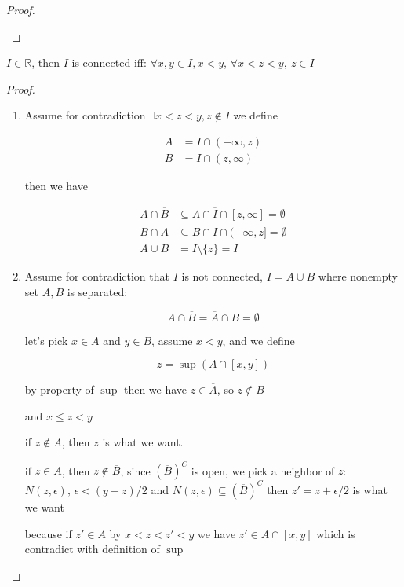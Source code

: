 \begin{proof}
\begin{enumerate}
   \end{enumerate} 
\end{proof}

\begin{thm}
    $I \in \mathbb{R}$, then $I$ is connected iff: $\forall x,y \in I, x <y$, $\forall x < z < y,\: z \in I$     
\end{thm}

\begin{proof}
    \begin{enumerate}
        \item Assume for contradiction $\exists x < z < y, z \notin I$ we define

        \begin{align*}
            A &= I \cap (-\infty, z) \\ 
            B &= I \cap (z, \infty)
        \end{align*}

        then we have

        \begin{align*}
            A \cap \overline{B} & \subseteq A \cap \overline{I} \cap [z, \infty] = \emptyset \\
            B \cap \overline{A} & \subseteq B \cap \overline{I} \cap (-\infty,z] = \emptyset \\
            A \cup B &= I \setminus \{ z \} = I
        \end{align*}

        \item Assume for contradiction that $I$ is not connected, $I = A \cup B$ where nonempty set $A,B$ is separated:

        \[
        A \cap \overline{B} = \overline{A} \cap B = \emptyset
        \]

        let's pick $x \in A$ and $y \in B$, assume $x < y$, and we define

        \[
            z = \sup \left( A \cap [x,y] \right)
        \]

        by property of $\sup$ then we have $z \in \overline{A}$, so $z \notin B$

        and $x \le z < y$

        if $z \notin A$, then $z$ is what we want. 
        
        if $z \in A$, then $z \notin \overline{B}$, since $(\overline{B})^C$ is open, 
        we pick a neighbor of $z$: $N(z, \epsilon),\, \epsilon < (y -z) / 2$ and $N(z, \epsilon) \subseteq (\overline{B})^C$
        then $z' = z + \epsilon / 2$ is what we want
        
        because if $z' \in A$ by $x < z < z' < y$ we have $z' \in A \cap [x,y]$ which 
        is contradict with definition of $\sup$


    \end{enumerate}
\end{proof}

